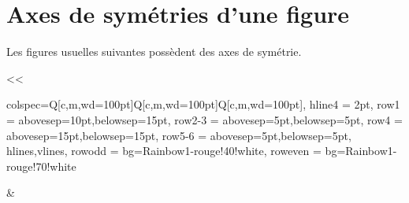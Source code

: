 \documentclass[../main.tex]{subfiles}
\begin{document}
        \part{Axes de symétries d'une figure}
            \begin{exemple}
                Les figures usuelles suivantes possèdent des axes de symétrie.
                \begin{center}
                    \exported[scale=1,lmargin=30,vmargins=30,active=1]%
                    <<
                        \begin{tblr}{
                            colspec={Q[c,m,wd=100pt]Q[c,m,wd=100pt]Q[c,m,wd=100pt]},
                            hline{4} = {2pt},
                            row{1} = {abovesep=10pt,belowsep=15pt},
                            row{2-3} = {abovesep=5pt,belowsep=5pt},
                            row{4} = {abovesep=15pt,belowsep=15pt},
                            row{5-6} = {abovesep=5pt,belowsep=5pt},
                            hlines,vlines,
                            row{odd} = {bg=Rainbow1-rouge!40!white},
                            row{even} = {bg=Rainbow1-rouge!70!white}%
                        }
                            &
\end{tblr}
\end{center}
\end{exemple}
\end{document}
